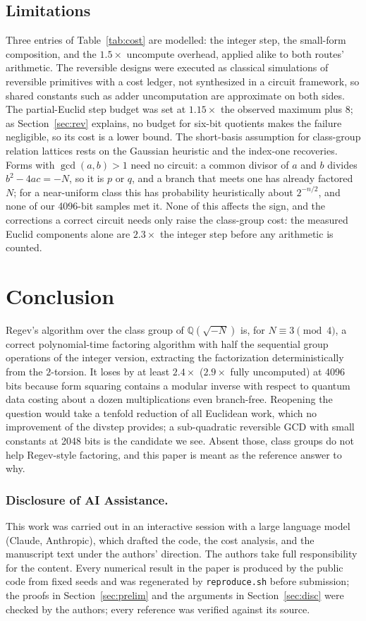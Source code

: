 \documentclass[runningheads]{llncs}
\newcommand{\Q}{\mathbb{Q}}
\begin{document}
\subsection{Limitations}
Three entries of Table~\ref{tab:cost} are modelled: the integer step, the small-form composition, and the $1.5\times$ uncompute overhead, applied alike to both routes' arithmetic. The reversible designs were executed as classical simulations of reversible primitives with a cost ledger, not synthesized in a circuit framework, so shared constants such as adder uncomputation are approximate on both sides. The partial-Euclid step budget was set at $1.15\times$ the observed maximum plus $8$; as Section~\ref{sec:rev} explains, no budget for six-bit quotients makes the failure negligible, so its cost is a lower bound. The short-basis assumption for class-group relation lattices rests on the Gaussian heuristic and the index-one recoveries. Forms with $\gcd(a,b)>1$ need no circuit: a common divisor of $a$ and $b$ divides $b^2-4ac=-N$, so it is $p$ or $q$, and a branch that meets one has already factored $N$; for a near-uniform class this has probability heuristically about $2^{-n/2}$, and none of our 4096-bit samples met it. None of this affects the sign, and the corrections a correct circuit needs only raise the class-group cost: the measured Euclid components alone are $2.3\times$ the integer step before any arithmetic is counted.

\section{Conclusion}
Regev's algorithm over the class group of $\Q(\sqrt{-N})$ is, for $N\equiv3\pmod4$, a correct polynomial-time factoring algorithm with half the sequential group operations of the integer version, extracting the factorization deterministically from the $2$-torsion. It loses by at least $2.4\times$ ($2.9\times$ fully uncomputed) at 4096 bits because form squaring contains a modular inverse with respect to quantum data costing about a dozen multiplications even branch-free. Reopening the question would take a tenfold reduction of all Euclidean work, which no improvement of the divstep provides; a sub-quadratic reversible GCD with small constants at 2048 bits is the candidate we see. Absent those, class groups do not help Regev-style factoring, and this paper is meant as the reference answer to why.

\subsubsection*{Disclosure of AI Assistance.}
This work was carried out in an interactive session with a large language model (Claude, Anthropic), which drafted the code, the cost analysis, and the manuscript text under the authors' direction. The authors take full responsibility for the content. Every numerical result in the paper is produced by the public code from fixed seeds and was regenerated by \texttt{reproduce.sh} before submission; the proofs in Section~\ref{sec:prelim} and the arguments in Section~\ref{sec:disc} were checked by the authors; every reference was verified against its source.



\end{document}
